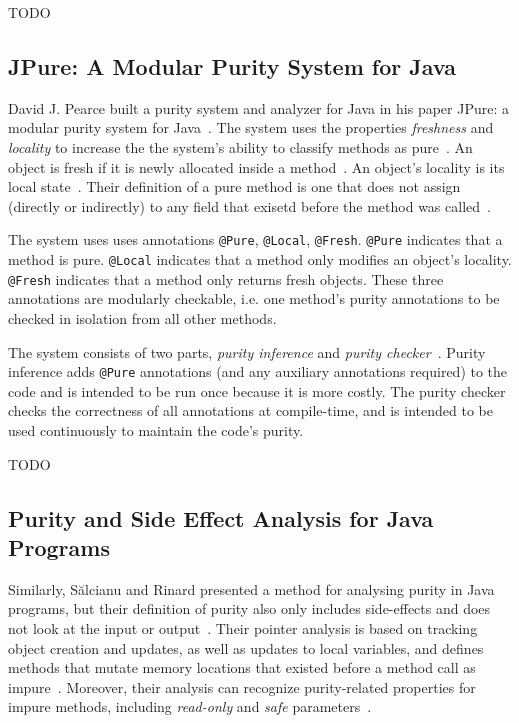\documentclass[a4paper,12pt]{article}
\begin{document}
TODO


\subsection{JPure: A Modular Purity System for Java} \label{sub:JPure: A Modular Purity System for Java}
David J. Pearce built a purity system and analyzer for Java in his paper JPure: a modular purity system for Java~\cite{pearce2011jpure}. The system uses the properties \textit{freshness} and \textit{locality} to increase the the system's ability to classify methods as pure~\cite{pearce2011jpure}. An object is fresh if it is newly allocated inside a method~\cite{pearce2011jpure}. An object's locality is its local state~\cite{pearce2011jpure}. Their definition of a pure method is one that does not assign (directly or indirectly) to any field that exisetd before the method was called~\cite{pearce2011jpure}.

The system uses uses annotations \texttt{@Pure}, \texttt{@Local}, \texttt{@Fresh}. \texttt{@Pure} indicates that a method is pure. \texttt{@Local} indicates that a method only modifies an object's locality. \texttt{@Fresh} indicates that a method only returns fresh objects. These three annotations are modularly checkable, i.e. one method's purity annotations to be checked in isolation from all other methods.

The system consists of two parts, \textit{purity inference} and \textit{purity checker}~\cite{pearce2011jpure}. Purity inference adds \texttt{@Pure} annotations (and any auxiliary annotations required) to the code and is intended to be run once because it is more costly. The purity checker checks the correctness of all annotations at compile-time, and is intended to be used continuously to maintain the code's purity.

TODO

\subsection{Purity and Side Effect Analysis for Java Programs} \label{sub:Purity and Side Effect Analysis for Java Programs}
Similarly, S\u{a}lcianu and Rinard presented a method for analysing purity in Java programs, but their definition of purity also only includes side-effects and does not look at the input or output~\cite{salcianu}. Their pointer analysis is based on tracking object creation and updates, as well as updates to local variables, and defines methods that mutate memory locations that existed before a method call as impure~\cite{salcianu}. Moreover, their analysis can recognize purity-related properties for impure methods, including \textit{read-only} and \textit{safe} parameters~\cite{salcianu}.
\end{document}
